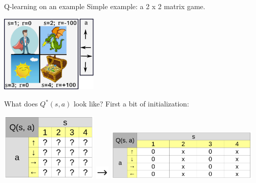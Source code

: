 \documentclass{beamer}
\begin{document}
\begin{frame}{Q-learning on an example}
    Simple example: a 2 x 2 matrix game.

    \begin{center}
      \includegraphics[width=0.35\textwidth]{./Figures/ANNs_reinforcement_learning/Q_learning_example}
    \end{center}

    What does $Q^{*}(s, a)$ look like? First a bit of initialization:

    \begin{center}
      \includegraphics[width=0.35\textwidth]{./Figures/ANNs_reinforcement_learning/Q_learning_example_mat}
      \includegraphics[width=0.05\textwidth]{./Figures/ANNs_reinforcement_learning/arrow_right}
      \includegraphics[width=0.55\textwidth]{./Figures/ANNs_reinforcement_learning/Q_learning_example_0}
    \end{center}
\end{frame}
\end{document}
